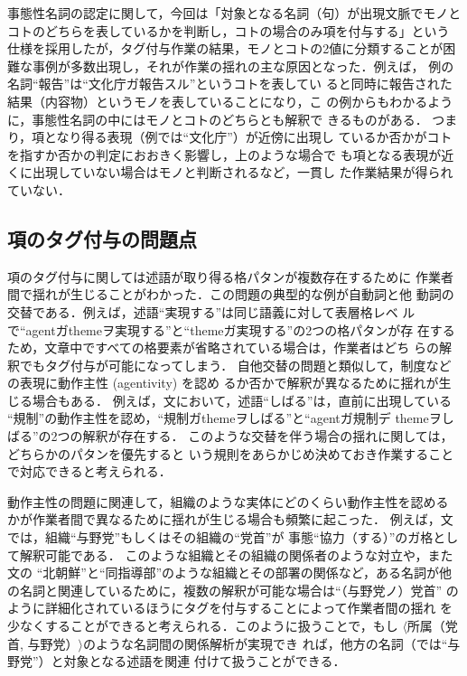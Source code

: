 \documentclass[japanese]{jnlp_1.4}
\begin{document}
事態性名詞の認定に関して，今回は「対象となる名詞（句）が出現文脈でモノと
コトのどちらを表しているかを判断し，コトの場合のみ項を付与する」という
仕様を採用したが，タグ付与作業の結果，モノとコトの2値に分類することが困
難な事例が多数出現し，それが作業の揺れの主な原因となった．例えば，
例の名詞``報告''は``文化庁ガ報告スル''というコトを表してい
ると同時に報告された結果（内容物）というモノを表していることになり，こ
の例からもわかるように，事態性名詞の中にはモノとコトのどちらとも解釈で
きるものがある．
つまり，項となり得る表現（例では``文化庁''）が近傍に出現し
ているか否かがコトを指すか否かの判定におおきく影響し，上のような場合で
も項となる表現が近くに出現していない場合はモノと判断されるなど，一貫し
た作業結果が得られていない．



\subsection{項のタグ付与の問題点}

項のタグ付与に関しては述語が取り得る格パタンが複数存在するために
作業者間で揺れが生じることがわかった．この問題の典型的な例が自動詞と他
動詞の交替である．例えば，述語\mbox{``実現する''}は同じ語義に対して表層格レベ
ルで``agentガthemeヲ実現する''と``themeガ実現する''の2つの格パタンが存
在するため，文章中ですべての格要素が省略されている場合は，作業者はどち
らの解釈でもタグ付与が可能になってしまう．
自他交替の問題と類似して，制度などの表現に動作主性 (agentivity) を認め
るか否かで解釈が異なるために揺れが生じる場合もある．
例えば，文において，述語``しばる''は，直前に出現している
``規制''の動作主性を認め，``規制ガthemeヲしばる''と``agentガ規制デ
themeヲしばる''の2つの解釈が存在する．
このような交替を伴う場合の揺れに関しては，どちらかのパタンを優先すると
いう規則をあらかじめ決めておき作業することで対応できると考えられる．

動作主性の問題に関連して，組織のような実体にどのくらい動作主性を認める
かが作業者間で異なるために揺れが生じる場合も頻繁に起こった．
例えば，文では，組織``与野党''もしくはその組織の``党首''が
事態``協力（する）''のガ格として解釈可能である．
このような組織とその組織の関係者のような対立や，また文の
``北朝鮮''と``同指導部''のような組織とその部署の関係など，ある名詞が他
の名詞と関連しているために，複数の解釈が可能な場合は``（与野党ノ）党首''
のように詳細化されているほうにタグを付与することによって作業者間の揺れ
を少なくすることができると考えられる．このように扱うことで，もし
$\langle$所属（党首, 与野党）$\rangle$のような名詞間の関係解析が実現でき
れば，他方の名詞（では``与野党''）と対象となる述語を関連
付けて扱うことができる．
\end{document}
